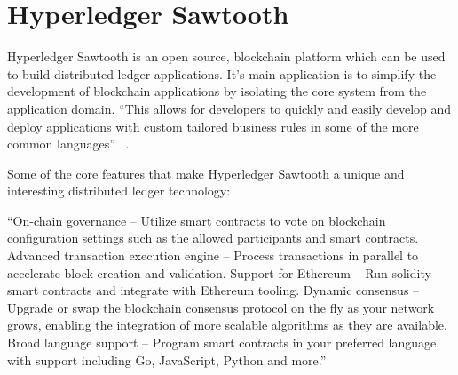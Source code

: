 \section{Hyperledger Sawtooth}

Hyperledger Sawtooth is an open source, blockchain platform which can
be used to build distributed ledger applications. It’s main
application is to simplify the development of blockchain applications
by isolating the core system from the application domain. ``This
allows for developers to quickly and easily develop and deploy
applications with custom tailored business rules in some of the more
common languages'' ~\cite{hid-sp18-414-Hyperledger_Sawtooth}.

Some of the core features that make Hyperledger Sawtooth a unique and
interesting distributed ledger technology:
  
``On-chain governance – Utilize smart contracts to vote on blockchain
configuration settings such as the allowed participants and smart
contracts.  Advanced transaction execution engine – Process
transactions in parallel to accelerate block creation and validation.
Support for Ethereum – Run solidity smart contracts and integrate with
Ethereum tooling.  Dynamic consensus – Upgrade or swap the blockchain
consensus protocol on the fly as your network grows, enabling the
integration of more scalable algorithms as they are available.  Broad
language support – Program smart contracts in your preferred language,
with support including Go, JavaScript, Python and 
more.'' ~\cite{hid-sp18-414-Linux_Foundation_Sawtooth}
